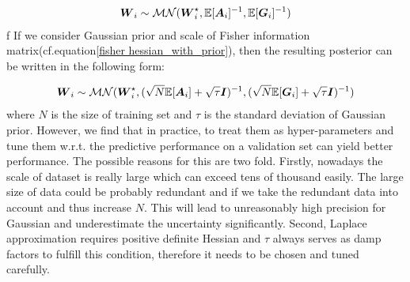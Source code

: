 \begin{equation}
\begin{aligned} \label{mvg}
\boldsymbol W_{i} \sim \mathcal{MN}(\boldsymbol W_i^\star, \mathbb E[\boldsymbol A_i]^{-1}, \mathbb E[\boldsymbol G_i]^{-1})
\end{aligned}
\end{equation}
f
If we consider Gaussian prior and scale of Fisher information matrix(cf.equation\ref{fisher hessian_with_prior}), then the resulting posterior can be written in the following form:

\begin{equation}
\begin{aligned} \label{mvg_priot}
\boldsymbol W_{i} \sim \mathcal{MN}(\boldsymbol W_i^\star, (\sqrt{N} \mathbb E[\boldsymbol A_i]+\sqrt{\tau}\boldsymbol I)^{-1}, (\sqrt{N}\mathbb E[\boldsymbol G_i]+\sqrt{\tau}\boldsymbol I)^{-1})
\end{aligned}
\end{equation} 
where $N$ is the size of training set and $\tau$ is the standard deviation of Gaussian prior.
However, we find that in practice, to treat them as hyper-parameters and tune them w.r.t. the predictive performance on a validation set can yield better performance. The possible reasons for this are two fold. Firstly, nowadays the scale of dataset is really large which can exceed tens of thousand easily. The large size of data could be probably redundant and if we take the redundant data into account and thus increase $N$. This will lead to unreasonably high precision for Gaussian and underestimate the uncertainty significantly. Second, Laplace approximation requires positive definite Hessian and $\tau$ always serves as damp factors to fulfill this condition, therefore it needs to be chosen and tuned carefully.    




